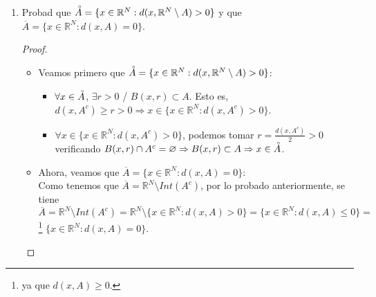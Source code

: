 \documentclass[a4paper, 11pt]{article} %
\let\emptyset\varnothing
\begin{document}
\begin{enumerate}
\begin{enumerate}[label=\alph*)]
		\begin{proof}
			\fbox{$\Leftarrow$} $\{N(A,\varepsilon): \varepsilon > 0\} \subset \mathcal{F} \Rightarrow A = \displaystyle{\bigcap_{\varepsilon>0}N(A,\varepsilon)}$ es cerrado. \\
			\fbox{$\Rightarrow$} $A$ cerrado $\Leftrightarrow A=\overline{A}$. \\
			Claramente, $\overline{A} \subseteq \displaystyle{\bigcap_{\varepsilon>0} N(A,\varepsilon)}$. \\
			Supongamos que $\overline{A} \neq \displaystyle{\bigcap_{\varepsilon>0} N(A,\varepsilon)}$:\\
			Entonces, podemos tomar un $x \in \displaystyle{\bigcap_{\varepsilon>0} N(A,\varepsilon)} \setminus \overline{A} \Rightarrow \exists r>0$  /  $B(x,r) \cap A = \emptyset \Rightarrow d(x,A) > r > 0$.\\
			Por otra parte, tenemos que si tomamos $\varepsilon_0 = \frac{r}{2} <r$, como $x \in \displaystyle{\bigcap_{\varepsilon>0} N(A,\varepsilon)} \Rightarrow d(x,A)<\varepsilon_0 < r$.\\
			Y llegamos a la contradicción.
		\end{proof}
		\item Probad que $\accentset{\circ}{A} = \{x \in \mathbb{R}^N: d(x,\mathbb{R}^N \setminus A) > 0\}$ y que $\overline{A} = \{x \in \mathbb{R}^N: d(x,A) = 0\}$.
		\begin{proof}
			\begin{itemize}
				\item Veamos primero que $\accentset{\circ}{A} = \{x \in \mathbb{R}^N: d(x,\mathbb{R}^N \setminus A) > 0\}$:
				\begin{itemize}
					\item \fbox{$\subset$} $\forall x \in \accentset{\circ}{A}$, $\exists r>0$  /  $B(x,r) \subset A$. Esto es, $d(x,A^c) \geq r > 0 \Rightarrow x \in \{x \in \mathbb{R}^N: d(x,A^c) > 0\}$.
					\item \fbox{$\supset$} $\forall x \in \{x \in \mathbb{R}^N: d(x,A^c) > 0\}$, podemos tomar $ r = \frac{d(x,A^c)}{2} > 0$ verificando $B(x,r) \cap A^c = \emptyset \Rightarrow B(x,r) \subset A \Rightarrow x \in \accentset{\circ}{A}$.
				\end{itemize}
				\item Ahora, veamos que $\overline{A} = \{x \in \mathbb{R}^N: d(x,A) = 0\}$:\\
				Como tenemos que $\overline{A}=\mathbb{R}^N \setminus Int(A^c)$, por lo probado anteriormente, se tiene $\overline{A}=\mathbb{R}^N \setminus Int(A^c)=\mathbb{R}^N \setminus \{x \in \mathbb{R}^N: d(x, A) > 0\} = \{x \in \mathbb{R}^N: d(x, A) \le 0\} =$\footnote{ya que $d(x,A)\geq 0$.} $\{x \in \mathbb{R}^N: d(x,A) = 0\}$.

\end{itemize}
\end{proof}
\end{enumerate}
\end{enumerate}
\end{document}
